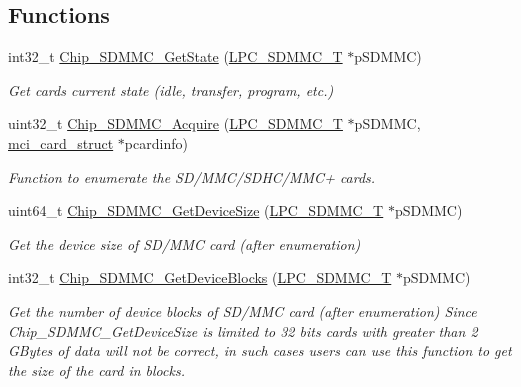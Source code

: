 \subsection*{Functions}
\begin{DoxyCompactItemize}
\item 
int32\+\_\+t \hyperlink{group___s_d_m_m_c__18_x_x__43_x_x_gaa3fa974f4b97abae649e0c85845d0ba5}{Chip\+\_\+\+S\+D\+M\+M\+C\+\_\+\+Get\+State} (\hyperlink{struct_l_p_c___s_d_m_m_c___t}{L\+P\+C\+\_\+\+S\+D\+M\+M\+C\+\_\+T} $\ast$p\+S\+D\+M\+MC)
\begin{DoxyCompactList}\small\item\em Get card\textquotesingle{}s current state (idle, transfer, program, etc.) \end{DoxyCompactList}\item 
uint32\+\_\+t \hyperlink{group___s_d_m_m_c__18_x_x__43_x_x_ga54405e71b2cefcdf5d91cfcb36ef24c0}{Chip\+\_\+\+S\+D\+M\+M\+C\+\_\+\+Acquire} (\hyperlink{struct_l_p_c___s_d_m_m_c___t}{L\+P\+C\+\_\+\+S\+D\+M\+M\+C\+\_\+T} $\ast$p\+S\+D\+M\+MC, \hyperlink{group___s_d_m_m_c__18_x_x__43_x_x_gaa558c8e6f8957a2a9014f575b7beabe5}{mci\+\_\+card\+\_\+struct} $\ast$pcardinfo)
\begin{DoxyCompactList}\small\item\em Function to enumerate the S\+D/\+M\+M\+C/\+S\+D\+H\+C/\+M\+M\+C+ cards. \end{DoxyCompactList}\item 
uint64\+\_\+t \hyperlink{group___s_d_m_m_c__18_x_x__43_x_x_ga1868dbbd245105bdb93679c1c975532f}{Chip\+\_\+\+S\+D\+M\+M\+C\+\_\+\+Get\+Device\+Size} (\hyperlink{struct_l_p_c___s_d_m_m_c___t}{L\+P\+C\+\_\+\+S\+D\+M\+M\+C\+\_\+T} $\ast$p\+S\+D\+M\+MC)
\begin{DoxyCompactList}\small\item\em Get the device size of S\+D/\+M\+MC card (after enumeration) \end{DoxyCompactList}\item 
int32\+\_\+t \hyperlink{group___s_d_m_m_c__18_x_x__43_x_x_gad6a8510859b4572e2caa914c236dcae0}{Chip\+\_\+\+S\+D\+M\+M\+C\+\_\+\+Get\+Device\+Blocks} (\hyperlink{struct_l_p_c___s_d_m_m_c___t}{L\+P\+C\+\_\+\+S\+D\+M\+M\+C\+\_\+T} $\ast$p\+S\+D\+M\+MC)
\begin{DoxyCompactList}\small\item\em Get the number of device blocks of S\+D/\+M\+MC card (after enumeration) Since Chip\+\_\+\+S\+D\+M\+M\+C\+\_\+\+Get\+Device\+Size is limited to 32 bits cards with greater than 2 G\+Bytes of data will not be correct, in such cases users can use this function to get the size of the card in blocks. \end{DoxyCompactList}\item 

\end{DoxyCompactItemize}
